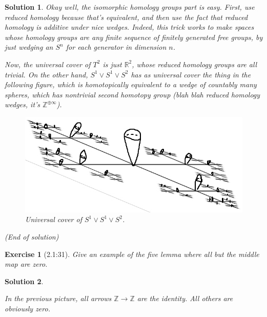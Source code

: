 \documentclass{article}
\theoremstyle{plain}
\newtheorem*{ex}{Exercise}
\theoremstyle{nonumberplain}
\newtheorem{sol}{Solution}
\newcommand{\R}{\mathbb{R}}
\newcommand{\Z}{\mathbb{Z}}
\begin{document}
\begin{sol}
Okay well, the isomorphic homology groups part is easy. First, use reduced homology because that's equivalent, and then use the fact that reduced homology is additive under nice wedges. Indeed, this trick works to make spaces whose homology groups are any finite sequence of finitely generated free groups, by just wedging an $S^n$ for each generator in dimension $n$.

Now, the universal cover of $T^2$ is just $\R^2$, whose reduced homology groups are all trivial. On the other hand, $S^1 \vee S^1 \vee S^2$ has as universal cover the thing in the following figure, which is homotopically equivalent to a wedge of countably many spheres, which has nontrivial second homotopy group (blah blah reduced homology wedges, it's $\Z^{\oplus \infty}$).
\begin{figure}[H]
\centering
\includegraphics{perspective}
\caption{Universal cover of $S^1 \vee S^1 \vee S^2$.}
\end{figure}

(End of solution)
\end{sol}

\begin{ex}[2.1:31]
Give an example of the five lemma where all but the middle map are zero.
\end{ex}

\begin{sol}
\leavevmode
\begin{figure}[H]
\centering
{}
\end{figure}

In the previous picture, all arrows $\Z \to \Z$ are the identity. All others are obviously zero.
\end{sol}
\end{document}
